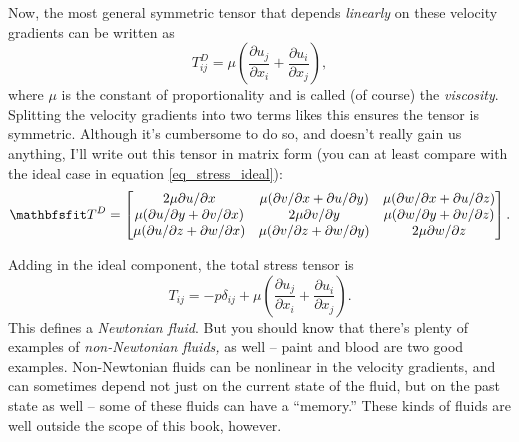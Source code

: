 Now, the most general symmetric tensor that depends \emph{linearly} on these velocity gradients can be written as
\begin{equation}
T_{ij}^D = \mu \left( \frac{\partial u_j}{\partial x_i} + \frac{\partial u_i}{\partial x_j} \right),
\end{equation}
where $\mu$ is the constant of proportionality and is called (of course) the \emph{viscosity}.  Splitting the velocity gradients into two terms likes this ensures the tensor is symmetric.  Although it's cumbersome to do so, and doesn't really gain us anything, I'll write out this tensor in matrix form (you can at least compare with the ideal case in equation \ref{eq_stress_ideal}):
\[
\tens{T}^D = \begin{bmatrix}
2 \mu \partial u / \partial x  &  \mu (\partial v / \partial x + \partial u / \partial y)  &   \mu (\partial w / \partial x + \partial u / \partial z) \\
\mu (\partial u / \partial y + \partial v / \partial x)  & 2\mu  \partial v / \partial y  &  \mu (\partial w / \partial y + \partial v / \partial z) \\
\mu (\partial u / \partial z + \partial w / \partial x)  &  \mu (\partial v / \partial z + \partial w / \partial y) & 2\mu  \partial w / \partial z
\end{bmatrix}.
\label{eq_stress_newtonian}
\]

Adding in the ideal component, the total stress tensor is
\begin{equation}
\label{eq_stress_tensor}
\boxed{
T_{ij} = -p \delta_{ij} +  \mu \left( \frac{\partial u_j}{\partial x_i} + \frac{\partial u_i}{\partial x_j} \right).
}
\end{equation}
This defines a \emph{Newtonian fluid}.  But you should know that there's plenty of examples of \emph{non-Newtonian fluids,} as well -- paint and blood are two good examples.  Non-Newtonian fluids can be nonlinear in the velocity gradients, and can sometimes depend not just on the current state of the fluid, but on the past state as well -- some of these fluids can have a ``memory.''  These kinds of fluids are well outside the scope of this book, however.

